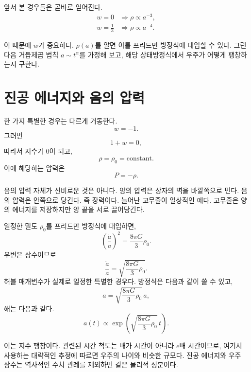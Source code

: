 앞서 본 경우들은 곧바로 얻어진다.
\begin{align}
w=0 &\Longrightarrow \rho \propto a^{-3},\\
w=\frac{1}{3} &\Longrightarrow \rho \propto a^{-4}.
\end{align}

이 때문에 \(w\)가 중요하다. \(\rho(a)\)를 알면 이를 프리드만 방정식에 대입할 수 있다. 그런 다음 거듭제곱 법칙 \(a\sim t^\alpha\)를 가정해 보고, 해당 상태방정식에서 우주가 어떻게 팽창하는지 구한다.

\section{진공 에너지와 음의 압력}

한 가지 특별한 경우는 다르게 거동한다.
\begin{equation}
w=-1.
\end{equation}
그러면
\begin{equation}
1+w=0,
\end{equation}
따라서 지수가 0이 되고,
\begin{equation}
\rho=\rho_0=\text{constant}.
\end{equation}
이에 해당하는 압력은
\begin{equation}
P=-\rho .
\end{equation}

음의 압력 자체가 신비로운 것은 아니다. 양의 압력은 상자의 벽을 바깥쪽으로 민다. 음의 압력은 안쪽으로 당긴다. 즉 장력이다. 늘어난 고무줄이 일상적인 예다. 고무줄은 양의 에너지를 저장하지만 양 끝을 서로 끌어당긴다.

일정한 밀도 \(\rho_0\)를 프리드만 방정식에 대입하면,
\begin{equation}
\left(\frac{\dot a}{a}\right)^2=\frac{8\pi G}{3}\rho_0.
\end{equation}
우변은 상수이므로
\begin{equation}
\frac{\dot a}{a}=\sqrt{\frac{8\pi G}{3}\rho_0}.
\end{equation}
허블 매개변수가 실제로 일정한 특별한 경우다. 방정식은 다음과 같이 쓸 수 있고,
\begin{equation}
\dot a=\sqrt{\frac{8\pi G}{3}\rho_0}\,a,
\end{equation}
해는 다음과 같다.
\begin{equation}
a(t)\propto \exp\!\left(\sqrt{\frac{8\pi G}{3}\rho_0}\,t\right).
\end{equation}

이는 지수 팽창이다. 관련된 시간 척도는 배가 시간이 아니라 \(e\)배 시간이므로, 여기서 사용하는 대략적인 추정에 따르면 우주의 나이와 비슷한 규모다. 진공 에너지와 우주 상수는 역사적인 수치 관례를 제외하면 같은 물리적 성분이다.

